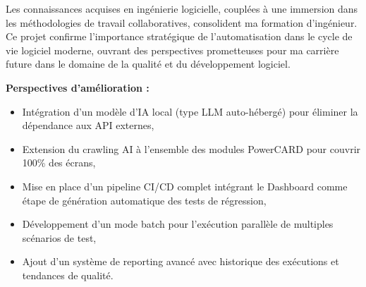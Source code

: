 Les connaissances acquises en ingénierie logicielle, couplées à une immersion dans les méthodologies de travail collaboratives, consolident ma formation d'ingénieur. Ce projet confirme l'importance stratégique de l'automatisation dans le cycle de vie logiciel moderne, ouvrant des perspectives prometteuses pour ma carrière future dans le domaine de la qualité et du développement logiciel.

\textbf{Perspectives d'amélioration :}
\begin{itemize}[leftmargin=*]
\item Intégration d'un modèle d'IA local (type LLM auto-hébergé) pour éliminer la dépendance aux API externes,
\item Extension du crawling AI à l'ensemble des modules PowerCARD pour couvrir 100\% des écrans,
\item Mise en place d'un pipeline CI/CD complet intégrant le Dashboard comme étape de génération automatique des tests de régression,
\item Développement d'un mode batch pour l'exécution parallèle de multiples scénarios de test,
\item Ajout d'un système de reporting avancé avec historique des exécutions et tendances de qualité.
\end{itemize}
